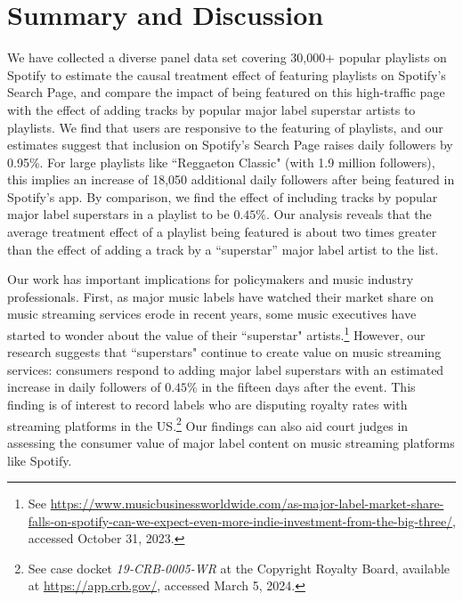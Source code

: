 \section{Summary and Discussion} 
\label{conclusion}

We have collected a diverse panel data set covering 30,000+ popular playlists on Spotify to estimate the causal treatment effect of featuring playlists on Spotify's Search Page, and compare the impact of being featured on this high-traffic page with the effect of adding tracks by popular major label superstar artists to playlists. We find that users are responsive to the featuring of playlists, and our estimates suggest that inclusion on Spotify's Search Page raises daily followers by 0.95\%. For large playlists like ``Reggaeton Classic" (with 1.9 million followers), this implies an increase of 18,050 additional daily followers after being featured in Spotify's app. By comparison, we find the effect of including tracks by popular major label superstars in a playlist to be $0.45\%$. Our analysis reveals that the average treatment effect of a playlist being featured is about two times greater than the effect of adding a track by a ``superstar” major label artist to the list. %

Our work has important implications for policymakers and music industry professionals.
First, as major music labels have watched their market share on music streaming services erode in recent years, some music executives have started to wonder about the value of their ``superstar" artists.\footnote{See \href{https://www.musicbusinessworldwide.com/as-major-label-market-share-falls-on-spotify-can-we-expect-even-more-indie-investment-from-the-big-three/}{https://www.musicbusinessworldwide.com/as-major-label-market-share-falls-on-spotify-can-we-expect-even-more-indie-investment-from-the-big-three/}, accessed October 31, 2023.} %
However, our research suggests that ``superstars" continue to create value on music streaming services: consumers respond to adding major label superstars with an estimated increase in daily followers of $0.45\%$ in the fifteen days after the event. 
This finding is of interest to record labels who are disputing royalty rates with streaming platforms in the US.\footnote{See case docket \textit{19-CRB-0005-WR} at the Copyright Royalty Board, available at \href{https://app.crb.gov/case/detail/19-CRB-0005-WR\%20\%282021-2025\%29}{https://app.crb.gov/}, accessed March 5, 2024.} Our findings can also aid court judges in assessing the consumer value of major label content on music streaming platforms like Spotify.

